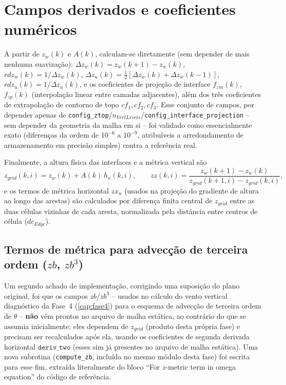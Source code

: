 \section{Campos derivados e coeficientes numéricos}

A partir de $z_w(k)$ e $A(k)$, calculam-se diretamente (sem depender de
mais nenhuma suavização): $\Delta z_w(k) = z_w(k{+}1)-z_w(k)$,
$rdz_w(k)=1/\Delta z_w(k)$, $\Delta z_u(k)=\tfrac12[\Delta z_w(k)+\Delta z_w(k{-}1)]$,
$rdz_u(k)=1/\Delta z_u(k)$, e os coeficientes de projeção de interface
$f_{zm}(k)$, $f_{zp}(k)$ (interpolação linear entre camadas adjacentes),
além dos três coeficientes de extrapolação de contorno de topo
$cf_1,cf_2,cf_3$. Esse conjunto de campos, por depender apenas de
\texttt{config\_ztop}/$n_{VertLevels}$/\texttt{config\_interface\_projection}
-- sem depender da geometria da malha em si -- foi validado como
essencialmente exato (diferenças da ordem de $10^{-6}$ a $10^{-9}$,
atribuíveis a arredondamento de armazenamento em precisão simples) contra
a referência real.

Finalmente, a altura física das interfaces e a métrica vertical são
\begin{equation}
  z_{grid}(k, i) = z_w(k) + A(k)\, h_x(k, i),
  \qquad
  zz(k, i) = \frac{z_w(k{+}1) - z_w(k)}{z_{grid}(k{+}1, i) - z_{grid}(k, i)},
  \label{eq:zgrid_zz}
\end{equation}
e os termos de métrica horizontal $zx_u$ (usados na projeção do gradiente
de altura ao longo das arestas) são calculados por diferença finita
central de $z_{grid}$ entre as duas células vizinhas de cada aresta,
normalizada pela distância entre centros de célula ($dc_{Edge}$).

\subsection{Termos de métrica para advecção de terceira ordem ($zb$, $zb^3$)}

Um segundo achado de implementação, corrigindo uma suposição do plano
original, foi que os campos $zb$/$zb^3$ -- usados no cálculo do vento
vertical diagnóstico da Fase~4 (\cref{cap:fase4}) para o esquema de
advecção de terceira ordem de $\theta$ -- \textbf{não} vêm prontos no
arquivo de malha estática, ao contrário do que se assumia inicialmente;
eles dependem de $z_{grid}$ (produto desta própria fase) e precisam ser
recalculados após ela, usando os coeficientes de segunda derivada
horizontal $\texttt{deriv\_two}$ (esses sim já presentes no arquivo de
malha estática). Uma nova subrotina (\texttt{compute\_zb}, incluída no
mesmo módulo desta fase) foi escrita para esse fim, extraída literalmente
do bloco ``For $z$-metric term in omega equation'' do código de
referência.

